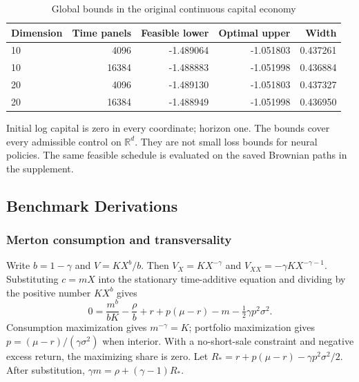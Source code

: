 \begin{table}[htbp]
\centering\small\setlength{\tabcolsep}{4pt}
\caption{Global bounds in the original continuous capital economy}\label{tab:r9capital}
\begin{tabular}{lrrrr}
\toprule
Dimension & Time panels & Feasible lower & Optimal upper & Width \\
\midrule
10 & 4096 & -1.489064 & -1.051803 & 0.437261 \\
10 & 16384 & -1.488883 & -1.051998 & 0.436884 \\
20 & 4096 & -1.489130 & -1.051803 & 0.437327 \\
20 & 16384 & -1.488949 & -1.051998 & 0.436950 \\
\bottomrule
\end{tabular}
\par\vspace{3pt}\begin{minipage}{0.97\linewidth}\footnotesize Initial log capital is zero in every coordinate; horizon one. The bounds cover every admissible control on $\mathbb R^d$. They are not small loss bounds for neural policies. The same feasible schedule is evaluated on the saved Brownian paths in the supplement.\end{minipage}
\end{table}






\subsection{Benchmark Derivations}
\subsubsection{Merton consumption and transversality}
Write $b=1-\gamma$ and $V=KX^b/b$. Then $V_X=KX^{-\gamma}$ and $V_{XX}=-\gamma KX^{-\gamma-1}$. Substituting $c=mX$ into the stationary time-additive equation and dividing by the positive number $KX^b$ gives
\[
 0=\frac{m^b}{bK}-\frac\rho b+r+p(\mu-r)-m-\tfrac12\gamma p^2\sigma^2.
\]
Consumption maximization gives $m^{-\gamma}=K$; portfolio maximization gives $p=(\mu-r)/(\gamma\sigma^2)$ when interior. With a no-short-sale constraint and negative excess return, the maximizing share is zero. Let $R_*=r+p(\mu-r)-\gamma p^2\sigma^2/2$. After substitution, $\gamma m=\rho+(\gamma-1)R_*$.


